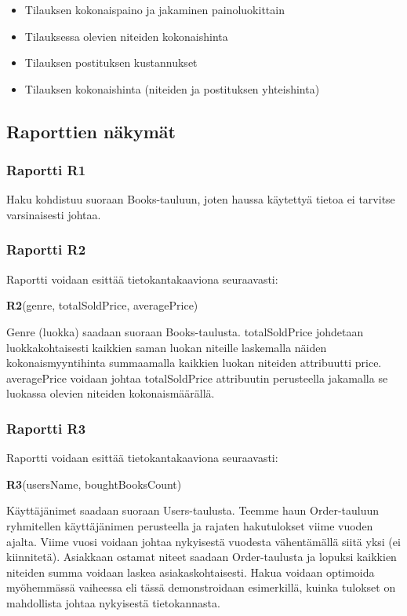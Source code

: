 \documentclass[11pt,a4paper]{article}
\begin{document}
\begin{itemize}
	\item Tilauksen kokonaispaino ja jakaminen painoluokittain
	\item Tilauksessa olevien niteiden kokonaishinta
	\item Tilauksen postituksen kustannukset
	\item Tilauksen kokonaishinta (niteiden ja postituksen yhteishinta)
\end{itemize}

\subsection{Raporttien näkymät}

\subsubsection{Raportti R1}

Haku kohdistuu suoraan Books-tauluun, joten haussa käytettyä tietoa ei tarvitse varsinaisesti johtaa.

\subsubsection{Raportti R2}

Raportti voidaan esittää tietokantakaaviona seuraavasti:

\small{\textbf{R2}(genre, totalSoldPrice, averagePrice)}

Genre (luokka) saadaan suoraan Books-taulusta. totalSoldPrice johdetaan luokkakohtaisesti kaikkien saman luokan niteille laskemalla näiden kokonaismyyntihinta summaamalla kaikkien luokan niteiden attribuutti price. averagePrice voidaan johtaa totalSoldPrice attribuutin perusteella jakamalla se luokassa olevien niteiden kokonaismäärällä.

\subsubsection{Raportti R3}

Raportti voidaan esittää tietokantakaaviona seuraavasti:

\textbf{R3}(usersName, boughtBooksCount)

Käyttäjänimet saadaan suoraan Users-taulusta. Teemme haun Order-tauluun ryhmitellen käyttäjänimen perusteella ja rajaten hakutulokset viime vuoden ajalta. Viime vuosi voidaan johtaa nykyisestä vuodesta vähentämällä siitä yksi (ei kiinnitetä). Asiakkaan ostamat niteet saadaan Order-taulusta ja lopuksi kaikkien niteiden summa voidaan laskea asiakaskohtaisesti. Hakua voidaan optimoida myöhemmässä vaiheessa eli tässä demonstroidaan esimerkillä, kuinka tulokset on mahdollista johtaa nykyisestä tietokannasta.
\end{document}
